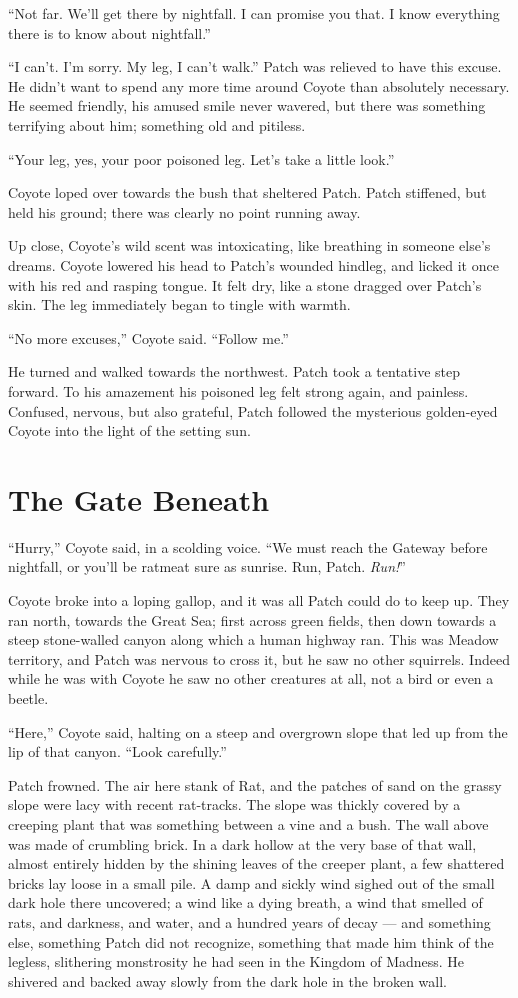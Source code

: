 \documentclass[ebook,oneside,openany,17pt]{memoir}
\renewcommand{\thechapter}{\Roman{chapter}}
\newcounter{sections}
\newcommand{\sections}[1]{%
  \section*{#1}
  \addtocounter{sections}{1}%
  \pdfbookmark[1]{#1}{section.\thechapter.\thesections}}
\begin{document}
“Not far. We’ll get there by nightfall. I can promise you that. I know
everything there is to know about nightfall.”

“I can’t. I’m sorry. My leg, I can’t walk.” Patch was relieved to have
this excuse. He didn’t want to spend any more time around Coyote than
absolutely necessary. He seemed friendly, his amused smile never
wavered, but there was something terrifying about him; something old
and pitiless.

“Your leg, yes, your poor poisoned leg. Let’s take a little look.”

Coyote loped over towards the bush that sheltered Patch. Patch
stiffened, but held his ground; there was clearly no point running
away.

Up close, Coyote’s wild scent was intoxicating, like breathing in
someone else’s dreams. Coyote lowered his head to Patch’s wounded
hindleg, and licked it once with his red and rasping tongue. It felt
dry, like a stone dragged over Patch’s skin. The leg immediately began
to tingle with warmth.

“No more excuses,” Coyote said. “Follow me.”

He turned and walked towards the northwest. Patch took a tentative
step forward. To his amazement his poisoned leg felt strong again, and
painless. Confused, nervous, but also grateful, Patch followed the
mysterious golden-eyed Coyote into the light of the setting sun.


\sections{The Gate Beneath}

“Hurry,” Coyote said, in a scolding voice. “We must reach the Gateway
before nightfall, or you’ll be ratmeat sure as sunrise. Run,
Patch. \emph{Run!}”

Coyote broke into a loping gallop, and it was all Patch could do to
keep up. They ran north, towards the Great Sea; first across green
fields, then down towards a steep stone-walled canyon along which a
human highway ran. This was Meadow territory, and Patch was nervous to
cross it, but he saw no other squirrels. Indeed while he was with
Coyote he saw no other creatures at all, not a bird or even a beetle.

“Here,” Coyote said, halting on a steep and overgrown slope that led
up from the lip of that canyon. “Look carefully.”

Patch frowned. The air here stank of Rat, and the patches of sand on
the grassy slope were lacy with recent rat-tracks. The slope was
thickly covered by a creeping plant that was something between a vine
and a bush. The wall above was made of crumbling brick. In a dark
hollow at the very base of that wall, almost entirely hidden by the
shining leaves of the creeper plant, a few shattered bricks lay loose
in a small pile. A damp and sickly wind sighed out of the small dark
hole there uncovered; a wind like a dying breath, a wind that smelled
of rats, and darkness, and water, and a hundred years of decay — and
something else, something Patch did not recognize, something that made
him think of the legless, slithering monstrosity he had seen in the
Kingdom of Madness. He shivered and backed away slowly from the dark
hole in the broken wall.
\end{document}
